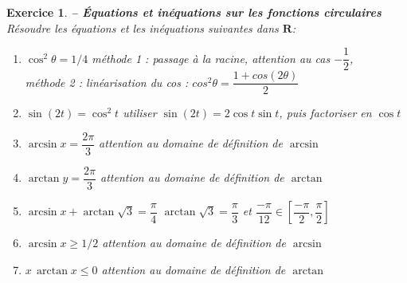 \documentclass[a4paper,11pt]{article}
\newenvironment{alphate}{\begin{enumerate}[label=\alph*)]}{\end{enumerate}}
\newtheorem{exo}{Exercice}
\newenvironment{exercice}{\begin{exo} \em}{\end{exo}}
\begin{document}
\begin{exercice} {\bf -- \'Equations et in\'equations sur les fonctions 
circulaires} \\ 
R\'esoudre les \'equations et les in\'equations suivantes dans $\mathbf{R}$:
\begin{alphate}
\item $\cos^2 \theta = 1/4$ \hspace{1cm} 
    méthode 1 : passage à la racine, attention au cas $-\dfrac{1}{2}$,\\
    méthode 2 : linéarisation du cos : $ cos^2\theta = \dfrac{1+cos(2\theta) }{2} $
\addtocounter{enumi}{1}
\item $\sin(2t) = \cos^2 t$ \hspace{1cm} 
    utiliser $\sin(2t) = 2 \cos t \sin t$, puis factoriser en $\cos t$
\addtocounter{enumi}{1}
\item $\arcsin x =\dfrac{2\pi}{3}$ \hspace{1cm} 
    attention au domaine de définition de $\arcsin$
\item $\arctan y =\dfrac{2\pi}{3}$ \hspace{1cm} 
    attention au domaine de définition de $\arctan$
\item $\arcsin x + \arctan \sqrt{3} =\dfrac{\pi}{4}$ \hspace{1cm} 
     $\arctan \sqrt{3} = \dfrac{\pi}{3}$ et $\dfrac{-\pi}{12} \in [\dfrac{-\pi}{2}, \dfrac{\pi}{2}]$
\addtocounter{enumi}{2}
\item $\arcsin x \geq 1/2$ \hspace{1cm} 
    attention au domaine de définition de $\arcsin$
\item $x\,\arctan x \leq 0$ \hspace{1cm} 
    attention au domaine de définition de $\arctan$
\end{alphate}
\end{exercice}
\bigskip 
\end{document}
